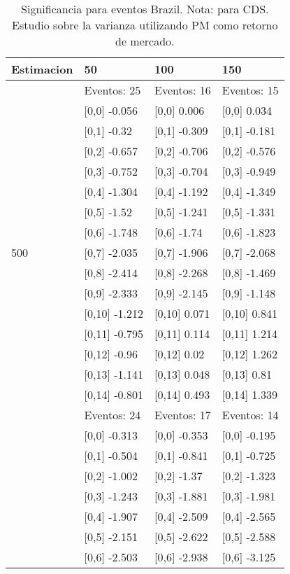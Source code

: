 \begin{table}

\caption{Significancia para eventos Brazil. Nota: para CDS. Estudio sobre la varianza utilizando PM como retorno de mercado.}
\centering
\begin{tabular}[t]{llll}
\toprule
Estimacion & 50 & 100 & 150\\
\midrule
 & Eventos:  25 & Eventos:  16 & Eventos:  15\\
 & {}[0,0] -0.056 & {}[0,0] 0.006 & {}[0,0] 0.034\\
 & {}[0,1] -0.32 & {}[0,1] -0.309 & {}[0,1] -0.181\\
 & {}[0,2] -0.657 & {}[0,2] -0.706 & {}[0,2] -0.576\\
 & {}[0,3] -0.752 & {}[0,3] -0.704 & {}[0,3] -0.949\\
\addlinespace
 & {}[0,4] -1.304 & {}[0,4] -1.192 & {}[0,4] -1.349\\
 & {}[0,5] -1.52 & {}[0,5] -1.241 & {}[0,5] -1.331\\
 & {}[0,6] -1.748 & {}[0,6] -1.74 & {}[0,6] -1.823\\
500 & {}[0,7] -2.035 & {}[0,7] -1.906 & {}[0,7] -2.068\\
 & {}[0,8] -2.414 & {}[0,8] -2.268 & {}[0,8] -1.469\\
\addlinespace
 & {}[0,9] -2.333 & {}[0,9] -2.145 & {}[0,9] -1.148\\
 & {}[0,10] -1.212 & {}[0,10] 0.071 & {}[0,10] 0.841\\
 & {}[0,11] -0.795 & {}[0,11] 0.114 & {}[0,11] 1.214\\
 & {}[0,12] -0.96 & {}[0,12] 0.02 & {}[0,12] 1.262\\
 & {}[0,13] -1.141 & {}[0,13] 0.048 & {}[0,13] 0.81\\
\addlinespace
 & {}[0,14] -0.801 & {}[0,14] 0.493 & {}[0,14] 1.339\\
 & Eventos:  24 & Eventos:  17 & Eventos:  14\\
 & {}[0,0] -0.313 & {}[0,0] -0.353 & {}[0,0] -0.195\\
 & {}[0,1] -0.504 & {}[0,1] -0.841 & {}[0,1] -0.725\\
 & {}[0,2] -1.002 & {}[0,2] -1.37 & {}[0,2] -1.323\\
\addlinespace
 & {}[0,3] -1.243 & {}[0,3] -1.881 & {}[0,3] -1.981\\
 & {}[0,4] -1.907 & {}[0,4] -2.509 & {}[0,4] -2.565\\
 & {}[0,5] -2.151 & {}[0,5] -2.622 & {}[0,5] -2.588\\
 & {}[0,6] -2.503 & {}[0,6] -2.938 & {}[0,6] -3.125\\

\end{tabular}
\end{table}
